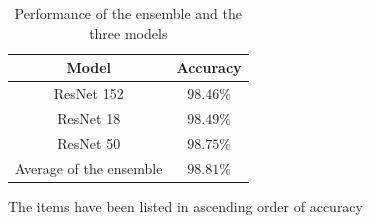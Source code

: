 \documentclass[11pt, journal]{IEEEtran}
\newcommand{\nl}{

\medskip

}
\begin{document}
\begin{table}[h!]
    \caption{Performance of the ensemble and the three models}
    \label{ensemble_performance}
    \centering
    \begin{tabular}{|c|c|}
        \hline
        \textbf{Model} & \textbf{Accuracy} \\
        \hline\hline
        ResNet 152 & $98.46\%$ \\
        \hline
        ResNet 18 & $98.49\%$ \\
        \hline
        ResNet 50 & $98.75\%$ \\
        \hline
        Average of the ensemble & $98.81\%$ \\
        \hline
    \end{tabular}
    \nl
    {\scriptsize The items have been listed in ascending order of accuracy}
\end{table}

\printbibliography
\end{document}
